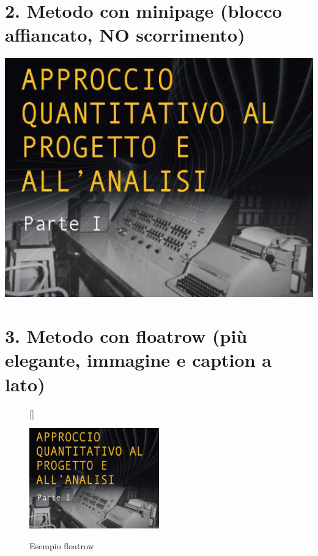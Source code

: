 \documentclass[12pt]{book}
\begin{document}
\section*{2. Metodo con minipage (blocco affiancato, NO scorrimento)}
\noindent
\begin{minipage}{0.5\textwidth}
\lipsum[3-4] %
\end{minipage}%
\hfill
\begin{minipage}{0.5\textwidth}
\centering
\includegraphics[width=\linewidth]{images/Lez01_p01_fig_01.png}
\end{minipage}

\newpage

\section*{3. Metodo con floatrow (più elegante, immagine e caption a lato)}

\lipsum[9-10] %
\begin{figure}[h]
[\FBwidth]
{\caption{Esempio floatrow}}
{\includegraphics[width=0.5\textwidth]{images/Lez01_p01_fig_01.png}}
\end{figure}

\lipsum[5-6] %
\end{document}
